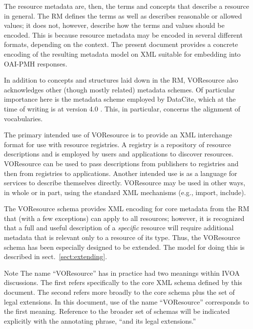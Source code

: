 \documentclass[11pt,a4paper]{ivoa}
\begin{document}
The resource metadata are, then, the terms and concepts that describe
a resource in general.  The RM defines the terms as well as describes
reasonable or allowed values; it does not, however, describe how the
terms and values should be encoded.  This is because resource metadata
may be encoded in several different formats, depending on the context.
The present document provides a concrete encoding of the resulting
metadata model on XML suitable for embedding into OAI-PMH responses.

In addition to concepts and structures laid down in the RM, VOResource
also acknowledges other (though mostly related) metadata schemes.  Of
particular importance here is the metadata scheme employed by DataCite,
which at the time of writing is at version 4.0 \citep{std:DataCite40}.
This, in particular, concerns the alignment of vocabularies.

The primary intended use of VOResource is to provide an XML interchange
format for use with resource registries.  A registry is a repository of
resource descriptions and is employed by users and applications to
discover resources.  VOResource can be used to pass descriptions from
publishers to registries and then from registries to applications.
Another intended use is as a language for services to describe themselves
directly.  VOResource may be used in other ways, in whole or in part,
using the standard XML mechanisms (e.g., import, include).  

The VOResource schema provides XML encoding for core
metadata from the RM that (with a few exceptions)
can apply to all resources; however, it is recognized that a full and
useful description of a \emph{specific} resource will require
additional metadata that is relevant only to a resource of its type.
Thus, the VOResource schema has been especially designed to be
extended.  The model for doing this is described in
sect.~\ref{sect:extending}.

\begin{admonition}{Note}
The name ``VOResource'' has in practice had two meanings within
IVOA discussions.  The first refers specifically to the core
XML schema defined by this document.  The second refers more
broadly to the core schema plus the set of legal extensions.
In this document, use of the name ``VOResource'' corresponds to
the first meaning.  Reference to the broader set of schemas
will be indicated explicitly with the annotating phrase, ``and
its legal extensions.''
\end{admonition}
\end{document}

